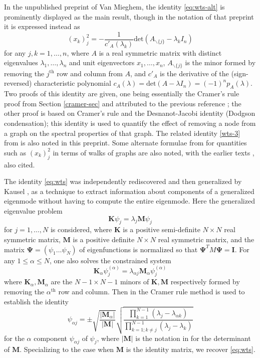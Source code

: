 \documentclass[12pt]{amsart}
\begin{document}
In the unpublished preprint \cite{2014arXiv1401.4580V} of Van Mieghem, the identity \eqref{eq:wts-alt} is prominently displayed as the main result, though in the notation of that preprint it is expressed instead as
$$ (x_k)_j^2 = -\frac{1}{c'_A(\lambda_k)} \mathrm{det}( A_{\backslash \{j\}} - \lambda_k I_n )$$
for any $j,k=1,\dots,n$, where $A$ is a real symmetric matrix with distinct eigenvalues $\lambda_1,\dots,\lambda_n$ and unit eigenvectors $x_1,\dots,x_n$, $A_{\backslash \{j\}}$ is the minor formed by removing the $j^{\mathrm{th}}$ row and column from $A$, and $c'_A$ is the derivative of the (sign-reversed) characteristic polynomial $c_A(\lambda) = \mathrm{det}(A - \lambda I_n) = (-1)^n p_A(\lambda)$.  Two proofs of this identity are given, one being essentially the Cramer's rule proof from Section \ref{cramer-sec} and attributed to the previous reference \cite{CVETKOVIC2007146}; the other proof is based on Cramer's rule and the Desnanot-Jacobi identity (Dodgson condensation); this identity is used to quantify the effect of removing a node from a graph on the spectral properties of that graph.  The related identity \eqref{wts-3} from \cite{tao2011} is also noted in this preprint.  Some alternate formulae from \cite{vmbook} for quantities such as $(x_k)_j^2$ in terms of walks of graphs are also noted, with the earlier texts \cite{godsil-book}, \cite{golub} also cited.

The identity \eqref{eq:wts} was independently rediscovered and then generalized by Kausel \cite{Kausel2018}, as a technique to extract information about components of a generalized eigenmode without having to compute the entire eigenmode.  Here the generalized eigenvalue problem
$$ \mathbf{K} \psi_j = \lambda_j \mathbf{M} \psi_j$$
for $j=1,\dots,N$ is considered, where $\mathbf{K}$ is a positive semi-definite $N \times N$ real symmetric matrix, $\mathbf{M}$ is a positive definite $N \times N$ real symmetric matrix, and the matrix $\mathbf{\Psi} = (\psi_1 \dots \psi_N)$ of eigenfunctions is normalized so that $\mathbf{\Psi}^T M \mathbf{\Psi} = \mathbf{I}$.  For any $1 \leq \alpha \leq N$, one also solves the constrained system
$$ \mathbf{K}_\alpha \psi_{j}^{(\alpha)} = \lambda_{\alpha j} \mathbf{M}_\alpha \psi_j^{(\alpha)}$$
where $\mathbf{K}_\alpha, \mathbf{M}_\alpha$ are the $N-1 \times N-1$ minors of $\mathbf{K}, \mathbf{M}$ respectively formed by removing the $\alpha^{\mathrm{th}}$ row and column.  Then in \cite[(18)]{Kausel2018} the Cramer rule method is used to establish the identity
$$ \psi_{\alpha j} = \pm \sqrt{\frac{|\mathbf{M}_\alpha|}{|\mathbf{M}|}} \sqrt{\frac{ \prod_{k=1}^{N-1} (\lambda_j - \lambda_{\alpha k})}{\prod_{k=1; k \neq j}^{N-1} (\lambda_j-\lambda_k)}}$$
for the $\alpha$ component $\psi_{\alpha j}$ of $\psi_j$, where $|\mathbf{M}|$ is the notation in \cite{Kausel2018} for the determinant of $\mathbf{M}$.  Specializing to the case when $\mathbf{M}$ is the identity matrix, we recover \eqref{eq:wts}.
\end{document}
